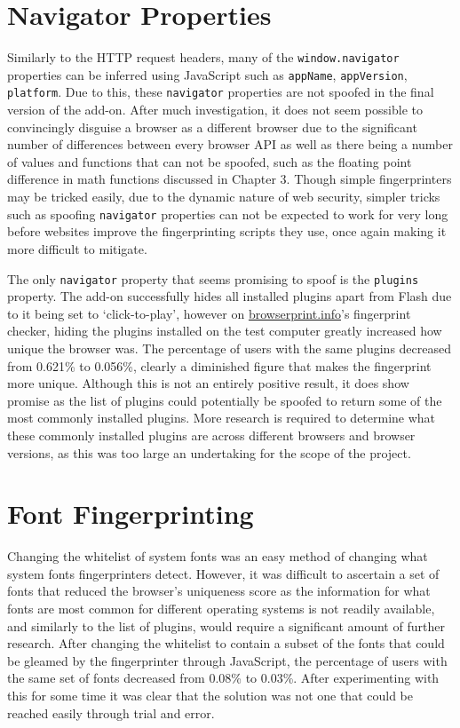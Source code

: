 \section{Navigator Properties}

Similarly to the HTTP request headers, many of the \texttt{window.navigator} properties can be inferred using JavaScript such as \texttt{appName}, \texttt{appVersion}, \texttt{platform}.
Due to this, these \texttt{navigator} properties are not spoofed in the final version of the add-on.
After much investigation, it does not seem possible to convincingly disguise a browser as a different browser due to the significant number of differences between every browser API as well as there being a number of values and functions that can not be spoofed, such as the floating point difference in math functions discussed in Chapter 3.
Though simple fingerprinters may be tricked easily, due to the dynamic nature of web security, simpler tricks such as spoofing \texttt{navigator} properties can not be expected to work for very long before websites improve the fingerprinting scripts they use, once again making it more difficult to mitigate.

The only \texttt{navigator} property that seems promising to spoof is the \texttt{plugins} property.
The add-on successfully hides all installed plugins apart from Flash due to it being set to `click-to-play', however on \url{browserprint.info}'s fingerprint checker, hiding the plugins installed on the test computer greatly increased how unique the browser was.
The percentage of users with the same plugins decreased from 0.621\% to 0.056\%, clearly a diminished figure that makes the fingerprint more unique.
Although this is not an entirely positive result, it does show promise as the list of plugins could potentially be spoofed to return some of the most commonly installed plugins.
More research is required to determine what these commonly installed plugins are across different browsers and browser versions, as this was too large an undertaking for the scope of the project.

\section{Font Fingerprinting}

Changing the whitelist of system fonts was an easy method of changing what system fonts fingerprinters detect.
However, it was difficult to ascertain a set of fonts that reduced the browser's uniqueness score as the information for what fonts are most common for different operating systems is not readily available, and similarly to the list of plugins, would require a significant amount of further research.
After changing the whitelist to contain a subset of the fonts that could be gleamed by the fingerprinter through JavaScript, the percentage of users with the same set of fonts decreased from 0.08\% to 0.03\%.
After experimenting with this for some time it was clear that the solution was not one that could be reached easily through trial and error.

